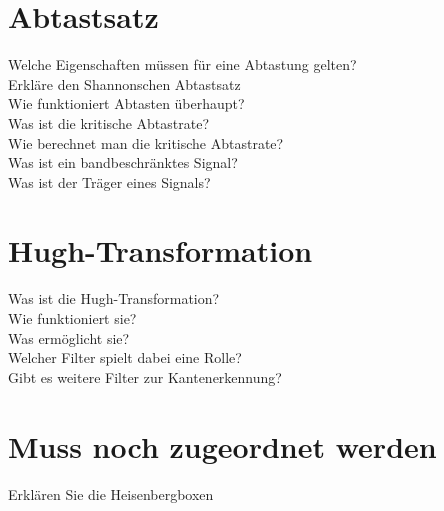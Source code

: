 \section{Abtastsatz}
\begin{description}
	\item[Welche Eigenschaften müssen für eine Abtastung gelten?]
	\item[Erkläre den Shannonschen Abtastsatz]
	\item[Wie funktioniert Abtasten überhaupt?]
	\item[Was ist die kritische Abtastrate?]
	\item[Wie berechnet man die kritische Abtastrate?]
	\item[Was ist ein bandbeschränktes Signal?]
	\item[Was ist der Träger eines Signals?]
	\end{description}
\section{Hugh-Transformation}
\begin{description}
	\item[Was ist die Hugh-Transformation?]
	\item[Wie funktioniert sie?]
	\item[Was ermöglicht sie?]
	\item[Welcher Filter spielt dabei eine Rolle?]
	\item[Gibt es weitere Filter zur Kantenerkennung?]
\end{description}
\section{Muss noch zugeordnet werden}
\begin{description}
	\item[Erklären Sie die Heisenbergboxen]
\end{description}


